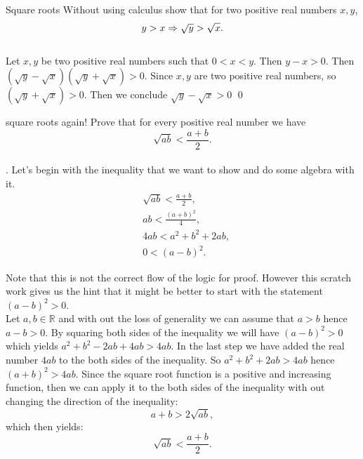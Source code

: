 \begin{example}{Square roots}
	 Without using calculus show that for two positive real numbers $ x,y $, 
	\[ y>x \Rightarrow \sqrt{y}>\sqrt{x}. \] \\
	
	 Let $ x,y $ be two positive real numbers such that $ 0<x<y $. Then $ y-x>0 $. Then $ (\sqrt{y} - \sqrt{x})(\sqrt{y} + \sqrt{x}) > 0 $. Since $ x,y $ are two positive real numbers, so $ (\sqrt{y} + \sqrt{x}) > 0 $. Then we conclude $ \sqrt{y} - \sqrt{x} >0 $ \qed
\end{example}

\begin{example}{square roots again!}
	 Prove that for every positive real number we have
	\begin{equation*}
		\sqrt{ab}< \frac{a+b}{2}.
	\end{equation*} \\

	. Let's begin with the inequality that we want to show and do some algebra with it.
	\begin{align*}
		&\sqrt{ab} < \frac{a+b}{2},\\
		&ab < \frac{(a+b)^2}{4},\\
		&4ab < a^2 + b^2 + 2ab,\\
		&0 < (a-b)^2.
	\end{align*}
	
	Note that this is not the correct flow of the logic for proof. However this scratch work gives us the hint that it might be better to start with the statement $ (a-b)^2 > 0 $. \\
	
	 Let $ a,b \in \mathbb{R} $ and with out the loss of generality we can assume that $ a>b $ hence $ a-b >0 $. By squaring both sides of the inequality we will have $ (a-b)^2 > 0 $ which yields $ a^2 + b^2 -2ab + 4ab > 4ab $. In the last step we have added the real number $ 4ab $ to the both sides of the inequality. So $ a^2 + b^2 + 2ab > 4ab $ hence $ (a+b)^2>4ab $. Since the square root function is a positive and increasing function, then we can apply it to the both sides of the inequality with out changing the direction of the inequality:
	\[ a+b > 2 \sqrt{ab}, \] which then yields:
	\[ \sqrt{ab} < \frac{a+b}{2}. \]
\end{example}


